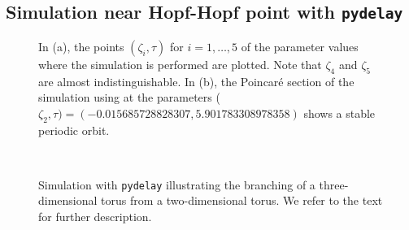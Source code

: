 \subsection{Simulation near Hopf-Hopf point with \texttt{pydelay}}
\begin{figure}[ht]
\hspace*{\fill}
\caption{In \textup{(a)}, the points $(\zeta_i,\tau)$ for $i=1,\dots,5$ of the parameter values where the simulation is performed are plotted. Note that $\zeta_4$ and $\zeta_5$ are almost indistinguishable. In \textup{(b)}, the Poincar\'e section of the simulation using \PYDELAY at the parameters ($\zeta_2,\tau)=(-0.015685728828307,5.901783308978358)$ shows a stable periodic orbit.}
\end{figure}

\begin{figure}[ht!]
\centering
{}
\hspace*{\fill}
 \\
%
\hspace*{\fill}
\caption{Simulation with \texttt{pydelay} illustrating the branching of a three-dimensional torus from a two-dimensional torus. We refer to the text for further description.}
\end{figure}

